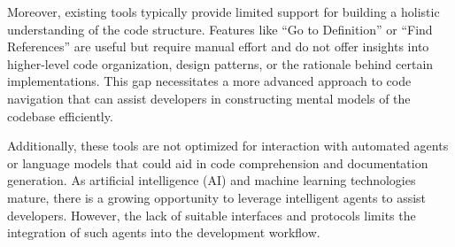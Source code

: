 \documentclass[12pt,oneside]{article}
\begin{document}
Moreover, existing tools typically provide limited support for building a holistic understanding of the code structure.
Features like “Go to Definition” or “Find References” are useful but require manual effort and do not offer insights 
into higher-level code organization, design patterns, or the rationale behind certain implementations. This gap necessitates 
a more advanced approach to code navigation that can assist developers in constructing mental models of the codebase efficiently.

Additionally, these tools are not optimized for interaction with automated agents or language models that could aid in code
comprehension and documentation generation. As artificial intelligence (AI) and machine learning technologies mature, there 
is a growing opportunity to leverage intelligent agents to assist developers. However, the lack of suitable interfaces and 
protocols limits the integration of such agents into the development workflow.

\printbibliography%
\end{document}
